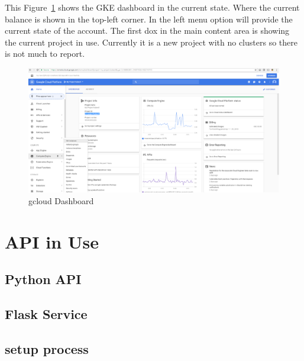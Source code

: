 This Figure~\ref{fig:gcloud-dashboard} shows the GKE dashboard in the current 
state. Where the current 
balance is shown in the top-left corner. In the left menu option will provide 
the current state of the account. The first dox in the main content area is 
showing the current project in use. Currently it is a new project with no
 clusters so there is not much to report.



\begin{figure}[htb]
 \centering\includegraphics[width=\columnwidth]{images/hid_417_gcloud_browser.png}
 \caption{gcloud Dashboard}\label{fig:gcloud-dashboard}
\end{figure}

 
 \section{API in Use}


\subsection{Python API}


\subsection{Flask Service}


\subsection{setup process}


